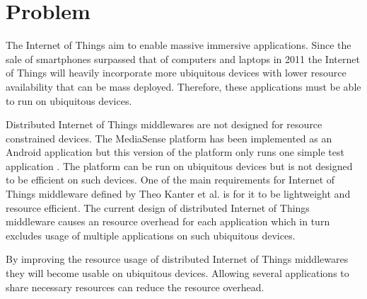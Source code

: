 \section{Problem}
The Internet of Things aim to enable massive immersive applications. Since the sale of smartphones surpassed that of computers and laptops in 2011 \cite{canalsys} the Internet of Things will heavily incorporate more ubiquitous devices with lower resource availability that can be mass deployed. Therefore, these applications must be able to run on ubiquitous devices.

Distributed Internet of Things middlewares are not designed for resource constrained devices. The MediaSense platform has been implemented as an Android application but this version of the platform only runs one simple test application \cite{mediasenseweb}. The platform can be run on ubiquitous devices but is not designed to be efficient on such devices. One of the main requirements for Internet of Things middleware defined by Theo Kanter et al. \cite{Kanter539187} is for it to be lightweight and resource efficient. The current design of distributed Internet of Things middleware causes an resource overhead for each application which in turn excludes usage of multiple applications on such ubiquitous devices. 

By improving the resource usage of distributed Internet of Things middlewares they will become usable on ubiquitous devices. Allowing several applications to share necessary resources can reduce the resource overhead. 
